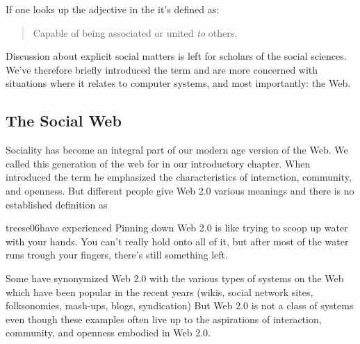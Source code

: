 If one looks up the adjective  in the
\citep[, ]{simpson89} it's defined as:

\begin{quote}
  Capable of being associated or united \emph{to} others.
\end{quote}

Discussion about explicit social matters is left for scholars of the social
sciences. We've therefore briefly introduced the term and are more concerned
with situations where it relates to computer systems, and most importantly:
the Web.

\subsection{The Social Web}
\label{section:background.sociality.the.social.web}

Sociality has become an integral part of our modern age version of the Web.
We called this generation of the web for %
in our introductory chapter. When \citet{oreilly05} introduced the term he
emphasized the characteristics of interaction, community, and openness.
But different people give Web 2.0 various meanings and there is no
established definition as
\begin{fullquote}[\p{15}]{treese06}{have experienced}
  Pinning down Web 2.0 is like trying to scoop up water with your hands. You
  can't really hold onto all of it, but after most of the water runs trough
  your fingers, there's still something left.
\end{fullquote}

Some have synonymized Web 2.0 with the various types of systems on the
Web which have been popular in the recent years
(wikis, social network sites, folksonomies, mash-ups, blogs, syndication)
But Web 2.0 is not a class of systems \citep[]{millard06} even though
these examples often live up to the aspirations of interaction, community,
and openness embodied in Web 2.0.

